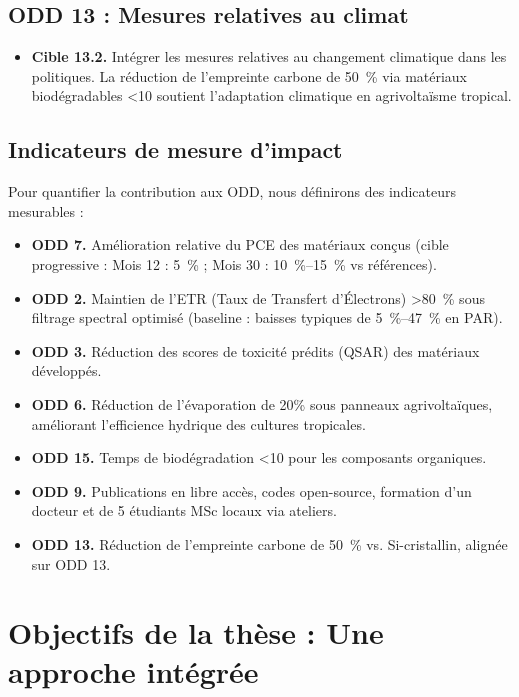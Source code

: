\documentclass[12pt, a4paper]{article}
\begin{document}
\subsection{ODD 13 : Mesures relatives au climat}

\begin{itemize}
    \item \textbf{Cible 13.2.} Intégrer les mesures relatives au changement climatique dans les politiques. La réduction de l'empreinte carbone de \SI{50}{\percent} via matériaux biodégradables \SI{<10}{\year} soutient l'adaptation climatique en agrivoltaïsme tropical.
\end{itemize}

\subsection{Indicateurs de mesure d'impact}

Pour quantifier la contribution aux ODD, nous définirons des indicateurs mesurables :
\begin{itemize}
    \item \textbf{ODD 7.} Amélioration relative du PCE des matériaux conçus (cible progressive : Mois 12 : \SI{+5}{\percent} ; Mois 30 : \SIrange{+10}{+15}{\percent} vs références).
    \item \textbf{ODD 2.} Maintien de l'ETR (Taux de Transfert d'Électrons) \SI{>80}{\percent} sous filtrage spectral optimisé (baseline : baisses typiques de \SIrange{5}{47}{\percent} en PAR).
    \item \textbf{ODD 3.} Réduction des scores de toxicité prédits (QSAR) des matériaux développés.
    \item \textbf{ODD 6.} Réduction de l'évaporation de 20\% sous panneaux agrivoltaïques, améliorant l'efficience hydrique des cultures tropicales.
    \item \textbf{ODD 15.} Temps de biodégradation \SI{<10}{\year} pour les composants organiques.
    \item \textbf{ODD 9.} Publications en libre accès, codes open-source, formation d'un docteur et de 5 étudiants MSc locaux via ateliers.
    \item \textbf{ODD 13.} Réduction de l'empreinte carbone de \SI{50}{\percent} vs. Si-cristallin, alignée sur ODD 13.
\end{itemize}

\section{Objectifs de la thèse : Une approche intégrée}
\end{document}
